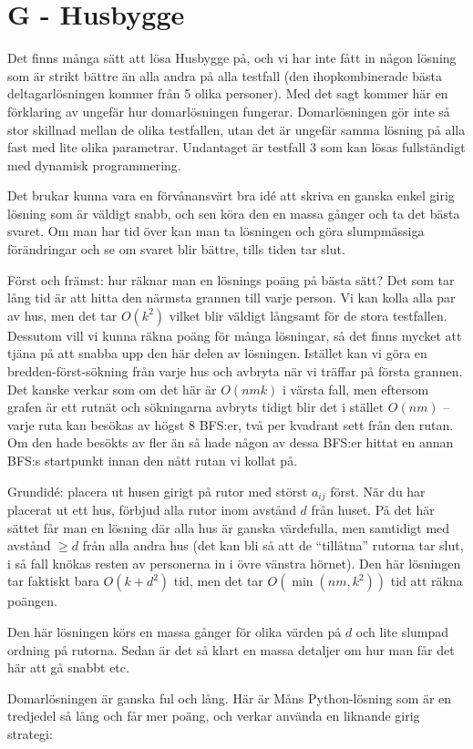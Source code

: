 \section*{G - Husbygge}

Det finns många sätt att lösa Husbygge på, och vi har inte fått in någon lösning som är strikt bättre än alla andra på alla testfall (den ihopkombinerade bästa deltagarlösningen kommer från 5 olika personer).
Med det sagt kommer här en förklaring av ungefär hur domarlösningen fungerar. Domarlösningen gör inte så stor skillnad mellan de olika testfallen, utan det är ungefär samma lösning på alla fast med lite olika parametrar. Undantaget är testfall 3 som kan lösas fullständigt med dynamisk programmering.

Det brukar kunna vara en förvånansvärt bra idé att skriva en ganska enkel girig lösning som är väldigt snabb, och sen köra den en massa gånger och ta det bästa svaret. Om man har tid över kan man ta lösningen och göra slumpmässiga förändringar och se om svaret blir bättre, tills tiden tar slut.

Först och främst: hur räknar man en lösnings poäng på bästa sätt? Det som tar lång tid är att hitta den närmsta grannen till varje person. Vi kan kolla alla par av hus, men det tar $O(k^2)$ vilket blir väldigt långsamt för de stora testfallen. Dessutom vill vi kunna räkna poäng för många lösningar, så det finns mycket att tjäna på att snabba upp den här delen av lösningen. Istället kan vi göra en bredden-först-sökning från varje hus och avbryta när vi träffar på första grannen. Det kanske verkar som om det här är $O(nmk)$ i värsta fall, men eftersom grafen är ett rutnät och sökningarna avbryts tidigt blir det i stället $O(nm)$ -- varje ruta kan besökas av högst $8$ BFS:er, två per kvadrant sett från den rutan. Om den hade besökts av fler än så hade någon av dessa BFS:er hittat en annan BFS:s startpunkt innan den nått rutan vi kollat på.

Grundidé: placera ut husen girigt på rutor med störst $a_{ij}$ först. När du har placerat ut ett hus, förbjud alla rutor inom avstånd $d$ från huset. På det här sättet får man en lösning där alla hus är ganska värdefulla, men samtidigt med avstånd $\geq d$ från alla andra hus (det kan bli så att de ``tillåtna'' rutorna tar slut, i så fall knökas resten av personerna in i övre vänstra hörnet). Den här lösningen tar faktiskt bara $O(k+d^2)$ tid, men det tar $O(\min(nm,k^2))$ tid att räkna poängen.

Den här lösningen körs en massa gånger för olika värden på $d$ och lite slumpad ordning på rutorna. Sedan är det så klart en massa detaljer om hur man får det här att gå snabbt etc.

Domarlösningen är ganska ful och lång. Här är Måns Python-lösning som är en tredjedel så lång och får mer poäng, och verkar använda en liknande girig strategi:


